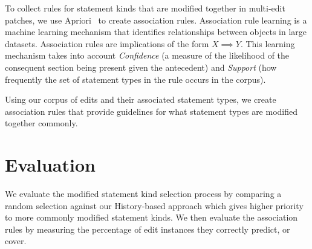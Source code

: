 \documentclass[sigconf]{acmart}
\begin{document}

To collect rules for statement kinds that are modified together in
multi-edit patches, we use Apriori~\cite{Agrawal94} to create
association rules.
Association rule learning is a machine learning mechanism that identifies
relationships between objects in large datasets. 
Association rules are implications of the
form $X \implies Y$.
This learning mechanism takes into 
account \textit{Confidence} (a measure of the likelihood 
of the consequent section being present given the 
antecedent) and \textit{Support} (how frequently the set of
statement types in the rule occurs in the corpus).

Using our corpus of edits and their associated statement types, 
we create association rules that provide guidelines
for what statement types are modified together commonly. 

\section{Evaluation}
\label{eval}

We evaluate the modified statement kind selection process
by comparing a random selection against our History-based 
approach which gives higher priority to more commonly 
modified statement kinds. We then evaluate the association
rules by measuring the percentage of edit instances they correctly predict, or 
cover.
\end{document}
